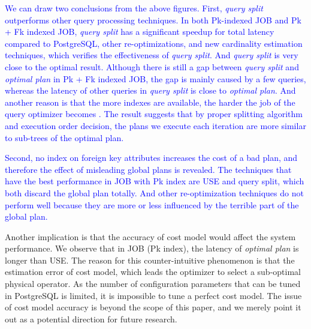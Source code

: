 \textcolor{blue}{
    We can draw two conclusions from the above figures. First, \textit{query split} outperforms other query processing techniques. In both Pk-indexed JOB and Pk + Fk indexed JOB, \textit{query split} has a significant speedup for total latency compared to PostgreSQL, other re-optimizations, and new cardinality estimation techniques, which verifies the effectiveness of \textit{query split}. And \textit{query split} is very close to the optimal result. Although there is still a gap between \textit{query split} and \textit{optimal plan} in Pk + Fk indexed JOB, the gap is mainly caused by a few queries, whereas the latency of other queries in \textit{query split} is close to \textit{optimal plan}. And another reason is that the more indexes are available, the harder the job of the query optimizer becomes \cite{JOB}. The result suggests that by proper splitting algorithm and execution order decision, the plans we execute each iteration are more similar to sub-trees of the optimal plan.
}\par
\textcolor{blue}{
    Second, no index on foreign key attributes increases the cost of a bad plan, and therefore the effect of misleading global plans is revealed. The techniques that have the best performance in JOB with Pk index are USE and query split, which both discard the global plan totally. And other re-optimization techniques do not perform well because they are more or less influenced by the terrible part of the global plan.
}\par
    Another implication is that the accuracy of cost model would affect the system performance. We observe that in JOB (Pk index), the latency of \textit{optimal plan} is longer than USE. The reason for this counter-intuitive phenomenon is that the estimation error of cost model, which leads the optimizer to select a sub-optimal physical operator. As the number of configuration parameters that can be tuned in PostgreSQL is limited, it is impossible to tune a perfect cost model. The issue of cost model accuracy is beyond the scope of this paper, and we merely point it out as a potential direction for future research.

